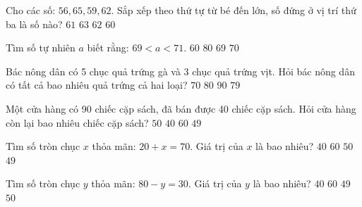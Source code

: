\begin{ex} %
Cho các số: $56, 65, 59, 62$. Sắp xếp theo thứ tự từ bé đến lớn, số đứng ở vị trí thứ ba là số nào?
\choice
{$61$}
{$63$}
{\True $62$}
{$60$}
\end{ex}

\begin{ex} %
Tìm số tự nhiên $a$ biết rằng: $69 < a < 71$.
\choice
{$60$}
{$80$}
{$69$}
{\True $70$}
\end{ex}

\begin{ex} %
Bác nông dân có 5 chục quả trứng gà và 3 chục quả trứng vịt. Hỏi bác nông dân có tất cả bao nhiêu quả trứng cả hai loại?
\choice
{$70$}
{\True $80$}
{$90$}
{$79$}
\end{ex}

\begin{ex} %
Một cửa hàng có 90 chiếc cặp sách, đã bán được 40 chiếc cặp sách. Hỏi cửa hàng còn lại bao nhiêu chiếc cặp sách?
\choice
{\True $50$}
{$40$}
{$60$}
{$49$}
\end{ex}

\begin{ex} %
Tìm số tròn chục $x$ thỏa mãn: $20 + x = 70$. Giá trị của $x$ là bao nhiêu?
\choice
{$40$}
{$60$}
{\True $50$}
{$49$}
\end{ex}

\begin{ex} %
Tìm số tròn chục $y$ thỏa mãn: $80 - y = 30$. Giá trị của $y$ là bao nhiêu?
\choice
{$40$}
{$60$}
{$49$}
{\True $50$}
\end{ex}

